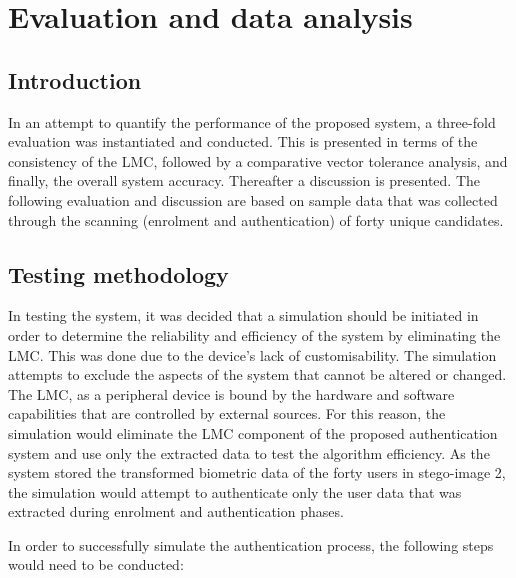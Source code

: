 \chapter{Evaluation and data analysis}


\section{Introduction}

In an attempt to quantify the performance of the proposed system, a three-fold evaluation was instantiated and conducted. This is presented in terms of the consistency of the LMC, followed by a comparative vector tolerance analysis, and finally, the overall system accuracy. Thereafter a discussion is presented. The following evaluation and discussion are based on sample data that was collected through the scanning (enrolment and authentication) of forty unique candidates.

\section{Testing methodology}


In testing the system, it was decided that a simulation should be initiated in order to determine the reliability and efficiency of the system by eliminating the LMC. This was done due to the device's lack of customisability. 
The simulation attempts to exclude the aspects of the system that cannot be altered or changed. The LMC, as a peripheral device is bound by the hardware and software capabilities that are controlled by external sources. For this reason, the simulation would eliminate the LMC component of the proposed authentication system and use only the extracted data to test the algorithm efficiency. As the system stored the transformed biometric data of the forty users in stego-image 2, the simulation would attempt to authenticate only the user data that was extracted during enrolment and authentication phases. 

In order to successfully simulate the authentication process, the following steps would need to be conducted: 

